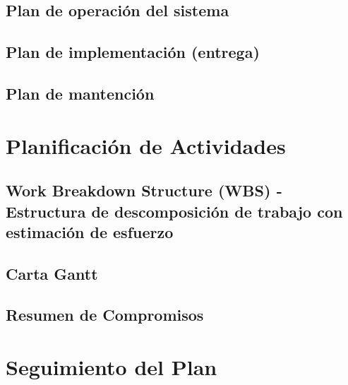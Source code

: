 \documentclass[letterpaper,spanish,10pt]{article}
\begin{document}
\subsection{Plan de operaci\'on del sistema}



\subsection{Plan de implementaci\'on (entrega)}



\subsection{Plan de mantenci\'on}



\section{Planificaci\'on de Actividades} %
\subsection{Work Breakdown Structure (WBS) ­ Estructura de descomposici\'on de trabajo
con estimación de esfuerzo}



\subsection{Carta Gantt}



\subsection{Resumen de Compromisos}



\section{Seguimiento del Plan}
\end{document}
